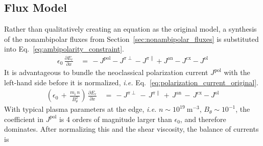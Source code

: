 \subsection{Flux Model}\label{ssec:flux_Z_equation}
Rather than qualitatively creating an equation as the original model, a synthesis of the nonambipolar fluxes from Section~\ref{sec:nonambipolar_fluxes} is substituted into Eq.~\ref{eq:ambipolarity_constraint}.
\begin{align} %
	\epsilon_0 \, \frac{\partial E_r}{\partial x} \,&=\, -J^\text{pol}
		- J^{\pi\perp} - J^{\pi\parallel} + J^\text{an} - J^\text{cx}
		- J^\text{ol} \label{eq:current_sum}
\end{align}
It is advantageous to bundle the neoclassical polarization current $J^\text{pol}$ with the left-hand side before it is normalized, \emph{i.e.} Eq.~\ref{eq:polarization_current_original}.
\begin{align} %
	\left(\epsilon_0 \,+\, \frac{m_i \, n}{B_\theta^2}\right) \,
	\frac{\partial E_r}{\partial x} \,&=\, -J^{\pi\perp} \,-\, J^{\pi\parallel}
		\,+\, J^\text{an} \,-\, J^\text{cx} - J^\text{ol}
\end{align}
With typical plasma parameters at the edge, \emph{i.e.} $n \sim 10^{19}~\text{m}^{-3}$, $B_\theta \sim 10^{-1}$, the coefficient in $J^\text{pol}$ is 4 orders of magnitude larger than $\epsilon_0$, and therefore dominates.
After normalizing this and the shear viscosity, the balance of currents is

